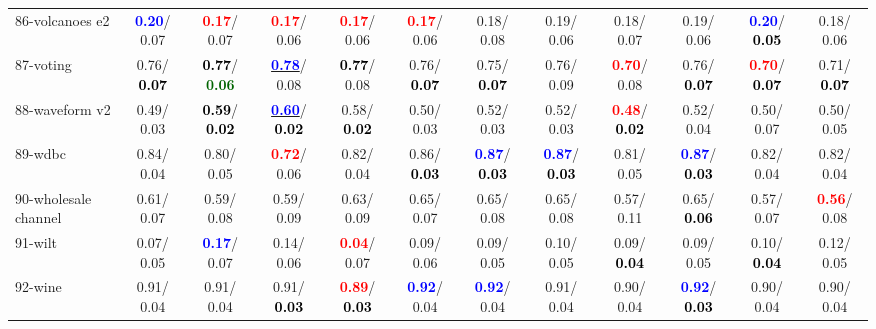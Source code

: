 \begin{table}[h]
\begin{center}
{\begin{tabular}{lc|c|c|c|c|c|c|c|c|c|c}
86-volcanoes e2 & \textcolor{blue}{\textbf{  0.20}}/  0.07 & \textcolor{red}{\textbf{  0.17}}/  0.07 & \textcolor{red}{\textbf{  0.17}}/  0.06 & \textcolor{red}{\textbf{  0.17}}/  0.06 & \textcolor{red}{\textbf{  0.17}}/  0.06 &   0.18/  0.08 &   0.19/  0.06 &   0.18/  0.07 &   0.19/  0.06 & \textcolor{blue}{\textbf{  0.20}}/\textcolor{black}{\textbf{  0.05}} &   0.18/  0.06 \\
87-voting &   0.76/\textcolor{black}{\textbf{  0.07}} & \textcolor{black}{\textbf{  0.77}}/\textcolor{darkgreen}{\textbf{  0.06}} & \underline{\textcolor{blue}{\textbf{  0.78}}}/  0.08 & \textcolor{black}{\textbf{  0.77}}/  0.08 &   0.76/\textcolor{black}{\textbf{  0.07}} &   0.75/\textcolor{black}{\textbf{  0.07}} &   0.76/  0.09 & \textcolor{red}{\textbf{  0.70}}/  0.08 &   0.76/\textcolor{black}{\textbf{  0.07}} & \textcolor{red}{\textbf{  0.70}}/\textcolor{black}{\textbf{  0.07}} &   0.71/\textcolor{black}{\textbf{  0.07}} \\
88-waveform v2 &   0.49/  0.03 & \textcolor{black}{\textbf{  0.59}}/\textcolor{black}{\textbf{  0.02}} & \underline{\textcolor{blue}{\textbf{  0.60}}}/\textcolor{black}{\textbf{  0.02}} &   0.58/\textcolor{black}{\textbf{  0.02}} &   0.50/  0.03 &   0.52/  0.03 &   0.52/  0.03 & \textcolor{red}{\textbf{  0.48}}/\textcolor{black}{\textbf{  0.02}} &   0.52/  0.04 &   0.50/  0.07 &   0.50/  0.05 \\
89-wdbc &   0.84/  0.04 &   0.80/  0.05 & \textcolor{red}{\textbf{  0.72}}/  0.06 &   0.82/  0.04 &   0.86/\textcolor{black}{\textbf{  0.03}} & \textcolor{blue}{\textbf{  0.87}}/\textcolor{black}{\textbf{  0.03}} & \textcolor{blue}{\textbf{  0.87}}/\textcolor{black}{\textbf{  0.03}} &   0.81/  0.05 & \textcolor{blue}{\textbf{  0.87}}/\textcolor{black}{\textbf{  0.03}} &   0.82/  0.04 &   0.82/  0.04 \\
90-wholesale channel &   0.61/  0.07 &   0.59/  0.08 &   0.59/  0.09 &   0.63/  0.09 &   0.65/  0.07 &   0.65/  0.08 &   0.65/  0.08 &   0.57/  0.11 &   0.65/\textcolor{black}{\textbf{  0.06}} &   0.57/  0.07 & \textcolor{red}{\textbf{  0.56}}/  0.08 \\
91-wilt &   0.07/  0.05 & \textcolor{blue}{\textbf{  0.17}}/  0.07 &   0.14/  0.06 & \textcolor{red}{\textbf{  0.04}}/  0.07 &   0.09/  0.06 &   0.09/  0.05 &   0.10/  0.05 &   0.09/\textcolor{black}{\textbf{  0.04}} &   0.09/  0.05 &   0.10/\textcolor{black}{\textbf{  0.04}} &   0.12/  0.05 \\
92-wine &   0.91/  0.04 &   0.91/  0.04 &   0.91/\textcolor{black}{\textbf{  0.03}} & \textcolor{red}{\textbf{  0.89}}/\textcolor{black}{\textbf{  0.03}} & \textcolor{blue}{\textbf{  0.92}}/  0.04 & \textcolor{blue}{\textbf{  0.92}}/  0.04 &   0.91/  0.04 &   0.90/  0.04 & \textcolor{blue}{\textbf{  0.92}}/\textcolor{black}{\textbf{  0.03}} &   0.90/  0.04 &   0.90/  0.04 \\ \hline

\end{tabular}}
\end{center}
\end{table}
